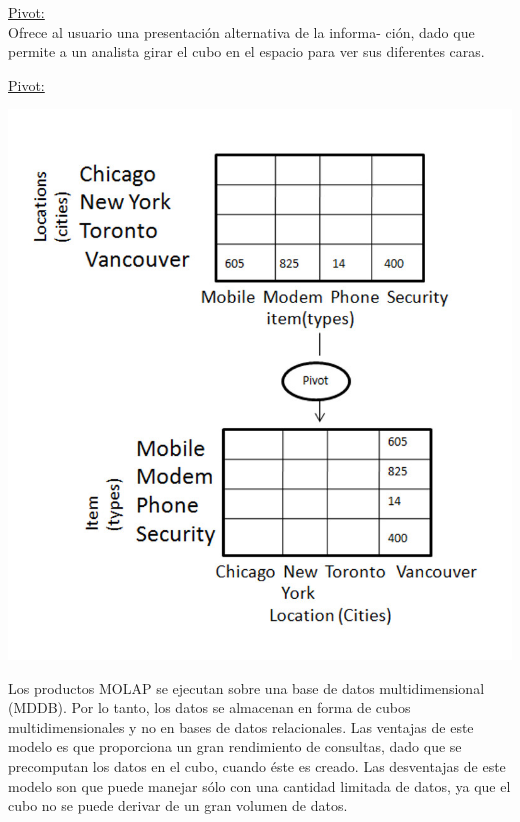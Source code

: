 \documentclass{fancyslides}
\begin{document}
\begin{frame}
\misc
{
  \underline{Pivot:}\\
  Ofrece al usuario una presentación alternativa de la informa- ción,
  dado que permite a un analista girar el cubo en el espacio para ver sus diferentes caras.
}
\end{frame}

\begin{frame}
\misc
{
  \underline{Pivot:}
  \begin{center}
  \includegraphics[scale=0.3]{pivot}
  \end{center}
}
\end{frame}

\begin{frame}
\end{frame}

\begin{frame}
\end{frame}

\begin{frame}
\misc
{
Los productos MOLAP se ejecutan sobre una base de datos multidimensional (MDDB).
Por lo tanto, los datos se almacenan en forma de cubos multidimensionales y no en bases de datos relacionales. Las ventajas de este modelo es que proporciona un
gran rendimiento de consultas, dado que se precomputan los datos en el cubo, cuando éste es creado. Las desventajas de este modelo son que puede manejar sólo con una cantidad limitada de datos, ya que el cubo no se puede derivar de un gran volumen de datos.
}
\end{frame}
\end{document}
